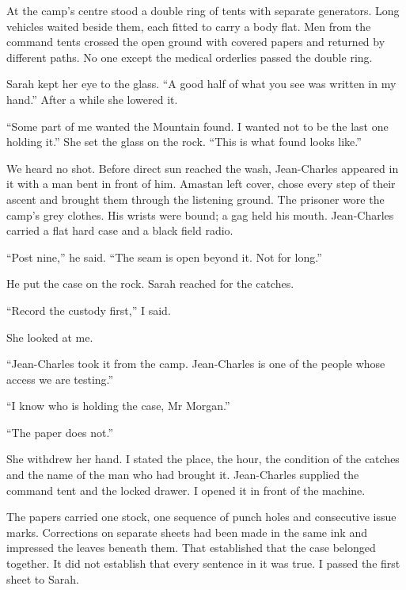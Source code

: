 At the camp's centre stood a double ring of tents with separate generators. Long vehicles waited beside them, each fitted to carry a body flat. Men from the command tents crossed the open ground with covered papers and returned by different paths. No one except the medical orderlies passed the double ring.\par

Sarah kept her eye to the glass. ``A good half of what you see was written in my hand.'' After a while she lowered it.\par

``Some part of me wanted the Mountain found. I wanted not to be the last one holding it.'' She set the glass on the rock. ``This is what found looks like.''\par

We heard no shot. Before direct sun reached the wash, Jean-Charles appeared in it with a man bent in front of him. Amastan left cover, chose every step of their ascent and brought them through the listening ground. The prisoner wore the camp's grey clothes. His wrists were bound; a gag held his mouth. Jean-Charles carried a flat hard case and a black field radio.\par

``Post nine,'' he said. ``The seam is open beyond it. Not for long.''\par

He put the case on the rock. Sarah reached for the catches.\par

``Record the custody first,'' I said.\par

She looked at me.\par

``Jean-Charles took it from the camp. Jean-Charles is one of the people whose access we are testing.''\par

``I know who is holding the case, Mr Morgan.''\par

``The paper does not.''\par

She withdrew her hand. I stated the place, the hour, the condition of the catches and the name of the man who had brought it. Jean-Charles supplied the command tent and the locked drawer. I opened it in front of the machine.\par

The papers carried one stock, one sequence of punch holes and consecutive issue marks. Corrections on separate sheets had been made in the same ink and impressed the leaves beneath them. That established that the case belonged together. It did not establish that every sentence in it was true. I passed the first sheet to Sarah.\par

